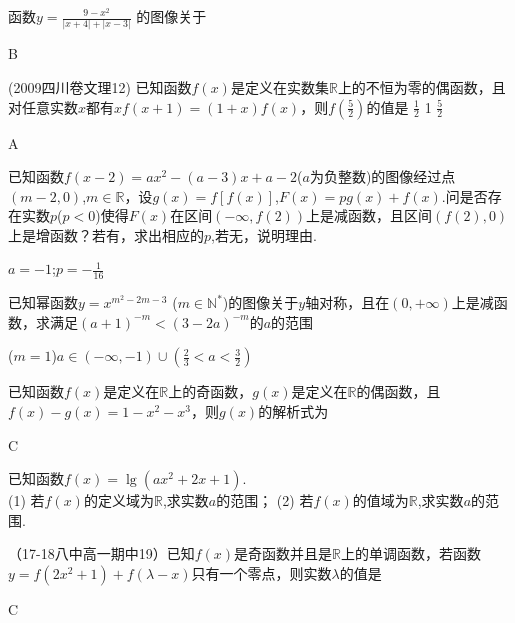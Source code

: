 \item
函数$y=\frac{9-x^2}{|x+4|+|x-3|}$ 的图像关于\xz
{}
\begin{answer}
B
\end{answer}

\item
(2009四川卷文理12) 已知函数$f(x)$是定义在实数集$\mathbb{R}$上的不恒为零的偶函数，且对任意实数$x$都有$xf(x+1)=(1+x)f(x) $，则$f(\frac{5}{2}) $的值是\xz
{}
{$\frac12$}
{1}
{$\frac52$}
\begin{answer}
A
\end{answer}

\item
已知函数$f(x-2)=ax^2-(a-3)x+a-2$($a$为负整数)的图像经过点 $(m-2,0) $,$m\in \mathbb{R}$，设$g(x)=f[f(x)] $,$F(x)=pg(x)+f(x) $.问是否存在实数$p$($p<0$)使得$F(x)$在区间$(-\infty,f(2)) $上是减函数，且区间$(f(2),0) $上是增函数？若有，求出相应的$p$,若无，说明理由.\\
\begin{answer}
$a=-1$;$p=-\frac{1}{16}$
\end{answer}

\item
已知幂函数$y=x^{m^2-2m-3} $ ($m\in \mathbb{N}^* $)的图像关于$y$轴对称，且在$(0,+\infty) $上是减函数，求满足$(a+1)^{-m}<(3-2a)^{-m} $的$a$的范围
\begin{answer}
($m=1$)$a\in (-\infty,-1)\cup(\frac23<a<\frac32)$
\end{answer}

\item
已知函数$f(x)$是定义在$\mathbb{R}$上的奇函数，$g(x)$是定义在$\mathbb{R} $的偶函数，且$f(x)-g(x)=1-x^2-x^3 $，则$g(x) $的解析式为\xz
{}
\begin{answer}
C
\end{answer}

\item
已知函数$f(x)=\lg(ax^2+2x+1) $.\\
(1) 若$f(x)$的定义域为$\mathbb{R}$,求实数$a$的范围；
(2) 若$f(x)$的值域为$\mathbb{R}$,求实数$a$的范围.

\item
（17-18八中高一期中19）已知$f(x)$是奇函数并且是$$上的单调函数，若函数$y=f(2x^2+1)+f(\lambda-x) $只有一个零点，则实数$\lambda $的值是\xz
{}
\begin{answer}
C
\end{answer}


